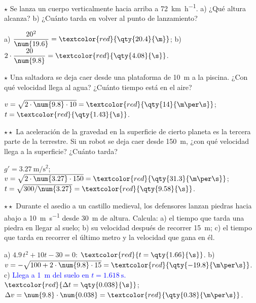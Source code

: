 \begin{exercise}
    \(\star\) Se lanza un cuerpo verticalmente hacia arriba a \qty{72}{\km\per\hour}. a) ¿Qué altura alcanza? b) ¿Cuánto tarda en
    volver al punto de lanzamiento?
    \begin{solu}
        a) \(\dfrac{20^2}{\num{19.6}} = \textcolor{red}{\qty{20.4}{\m}}\); b) \(2 \cdot \dfrac{20}{\num{9.8}} = \textcolor{red}{\qty{4.08}{\s}}\).
    \end{solu}
\end{exercise}

\begin{exercise}
    \(\star\) Una saltadora se deja caer desde una plataforma de \qty{10}{\m} a la piscina. ¿Con qué velocidad llega al agua? ¿Cuánto
    tiempo está en el aire?
    \begin{solu}
        \(v = \sqrt{2 \cdot \num{9.8} \cdot 10} = \textcolor{red}{\qty{14}{\m\per\s}}\); \(t = \textcolor{red}{\qty{1.43}{\s}}\).
    \end{solu}
\end{exercise}

\begin{exercise}
    \(\star\star\) La aceleración de la gravedad en la superficie de cierto planeta es la tercera parte de la terrestre. Si un robot
    se deja caer desde \qty{150}{\m}, ¿con qué velocidad llega a la superficie? ¿Cuánto tarda?
    \begin{solu}
        \(g' = \qty{3.27}{\m\per\s\squared}\); \(v = \sqrt{2 \cdot \num{3.27} \cdot 150} = \textcolor{red}{\qty{31.3}{\m\per\s}}\);
        \(t = \sqrt{300/\num{3.27}} = \textcolor{red}{\qty{9.58}{\s}}\).
    \end{solu}
\end{exercise}

\begin{exercise}
    \(\star\star\) Durante el asedio a un castillo medieval, los defensores lanzan piedras hacia abajo a \qty{10}{\m\per\s} desde
    \qty{30}{\m} de altura. Calcula: a) el tiempo que tarda una piedra en llegar al suelo; b) su velocidad después de recorrer
    \qty{15}{\m}; c) el tiempo que tarda en recorrer el último metro y la velocidad que gana en él.
    \begin{solu}
        a) \(\num{4.9}\,t^2 + 10t - 30 = 0\): \(\textcolor{red}{t = \qty{1.66}{\s}}\). b) \(v = -\sqrt{100 + 2 \cdot \num{9.8} \cdot 15} =
        \textcolor{red}{\qty{-19.8}{\m\per\s}}\). c) \textcolor{blue}{Llega a \qty{1}{\m} del suelo en \(t = \qty{1.618}{\s}\).}
        \(\textcolor{red}{\Delta t = \qty{0.038}{\s}}\); \(\Delta v = \num{9.8} \cdot \num{0.038} = \textcolor{red}{\qty{0.38}{\m\per\s}}\).
    \end{solu}
\end{exercise}

